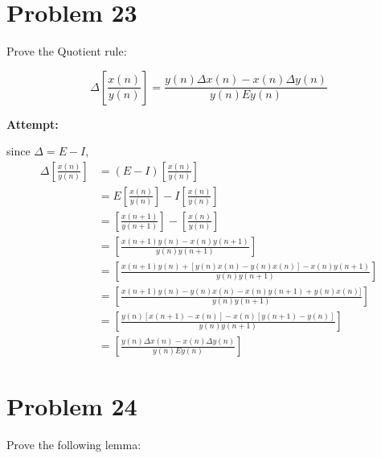 \documentclass[12pt,letterpaper]{article}
\theoremstyle{definition}
\begin{document}
\section*{Problem 23}

Prove the Quotient rule:

\begin{equation*}
    \Delta\left[\frac{x(n)}{y(n)}\right] = \frac{y(n)\Delta x(n) - x(n) \Delta y(n)}{y(n)Ey(n)}
\end{equation*}



\textbf{Attempt:}

    \begin{changemargin}{.5cm}{0cm}
        since $\Delta = E-I$,
        \begin{align*}
            \Delta\left[\frac{x(n)}{y(n)}\right] &= (E-I)\left[\frac{x(n)}{y(n)}\right]\\
            &= E\left[\frac{x(n)}{y(n)}\right] -I\left[\frac{x(n)}{y(n)}\right] \\
            &=\left[\frac{x(n+1)}{y(n+1)}\right] -\left[\frac{x(n)}{y(n)}\right] \\
            &= \left[\frac{x(n+1)y(n)-x(n)y(n+1)}{y(n)y(n+1)}\right] \\
            &=\left[\frac{x(n+1)y(n)+[y(n)x(n)-y(n)x(n)]-x(n)y(n+1)}{y(n)y(n+1)}\right] \\
            &=\left[\frac{x(n+1)y(n)-y(n)x(n)-x(n)y(n+1)+y(n)x(n)]}{y(n)y(n+1)}\right] \\
            &=\left[\frac{y(n)[x(n+1)-x(n)]-x(n)[y(n+1)-y(n)]}{y(n)y(n+1)}\right] \\
            &=\left[\frac{y(n)\Delta x(n)-x(n)\Delta y(n)}{y(n)Ey(n)}\right]
        \end{align*}

    \end{changemargin}





\newpage

%

\section*{Problem 24}

Prove the following lemma:
\end{document}
